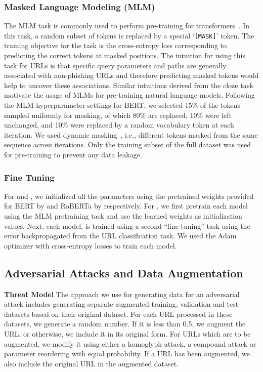 \subsubsection{Masked Language Modeling (MLM)}
The MLM task is commonly used to perform pre-training for transformers~\cite{devlin2019bert,liu2019roberta}. In this task, a random subset of tokens is replaced by a special `\texttt{[MASK]}' token.
 The training objective for the task is the cross-entropy loss corresponding to predicting the correct tokens at masked positions.
 The intuition for using this task for URLs is that specific query parameters and paths are generally associated with non-phishing URLs and therefore predicting masked tokens would help to uncover these associations.
 Similar intuitions derived from the cloze task~\cite{taylor1953cloze} motivate the usage of MLMs for pre-training natural language models.
Following the MLM hyperparameter settings for BERT, we selected 15\% of the tokens sampled uniformly for masking, of which 80\% are replaced, 10\% were left unchanged, and 10\% were replaced by a random vocabulary token at each iteration.
We used dynamic masking~\cite{liu2019roberta}, i.e., different tokens masked from the same sequence across iterations.
 Only the training subset of the full dataset was used for pre-training to prevent any data leakage. 

 \subsubsection{Fine Tuning}
 For \URLTranSysb and \URLTranSysr, we initialized all the parameters using the pretrained weights provided for BERT by \citet{devlin2019bert} and RoBERTa by \citet{liu2019roberta} respectively.
 For \URLTranSysc, we first pretrain each model using the MLM pretraining task and use the learned weights as initialization values.
 Next, each \URLTranSys model, is trained
 using a second ``fine-tuning'' task using the error backpropagated from the URL classification task.
 We used the Adam~\cite{kingma2014adam} optimizer with cross-entropy losses to train each model.
 
 \subsection{Adversarial Attacks and Data Augmentation}
 \label{sec:urltran:adv_attack}
 
\textbf{Threat Model}
The approach we use for generating data for an adversarial attack includes generating separate augmented training, validation and test datasets based on their original dataset.%
For each URL processed in these datasets, we generate
a random number. If it is less than 0.5, we augment the URL, or otherwise, we include it in its original form. For URLs which are to be augmented,
we modify it using either a homoglyph attack, a compound attack or parameter reordering with equal probability. If a URL has been augmented,
we also include the original URL in the augmented dataset. 

